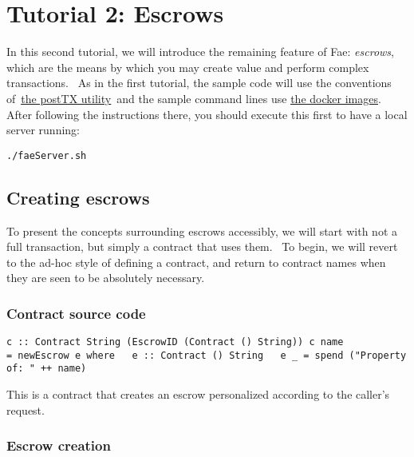 \documentclass[11pt]{article}
\newcommand{\codeblock}[1]{\begin{mdframed}[
    backgroundcolor=header-color,
    linecolor=header-color,
    innertopmargin=10pt,
    ]{\texttt{#1}}\end{mdframed}}
\DeclareRobustCommand{\fuline}[1]{\texorpdfstring{\uline{#1}}{#1}}
\begin{document}
\section{Tutorial 2: Escrows}
\vspace{5.5pt}

In this second tutorial, we will introduce the remaining feature of Fae: \textit{escrows}, which are the means by which you may create value and perform complex transactions.  As in the first tutorial, the sample code will use the conventions of \href{https://consensys.quip.com/kN9MAhiNm8dz/Project-information\%23GTTACAArd2o}{\fuline{the postTX utility}} and the sample command lines use \href{https://consensys.quip.com/kN9MAhiNm8dz/Project-information\%23GTTACAfd57C}{\fuline{the docker images}}.  After following the instructions there, you should execute this first to have a local server running:

\codeblock{.\slash{}faeServer.sh}

\subsection{Creating escrows}
\vspace{5.5pt}

To present the concepts surrounding escrows accessibly, we will start with not a full transaction, but simply a contract that uses them.  To begin, we will revert to the ad-hoc style of defining a contract, and return to contract names when they are seen to be absolutely necessary.

\subsubsection{Contract source code}
\vspace{5.5pt}

\codeblock{c :: Contract String (EscrowID (Contract () String))\newline
c name = newEscrow e where\newline
  e :: Contract () String\newline
  e \_ = spend ("Property of: " ++ name)}

This is a contract that creates an escrow personalized according to the caller's request.

\subsubsection{Escrow creation}
\vspace{5.5pt}
\end{document}

